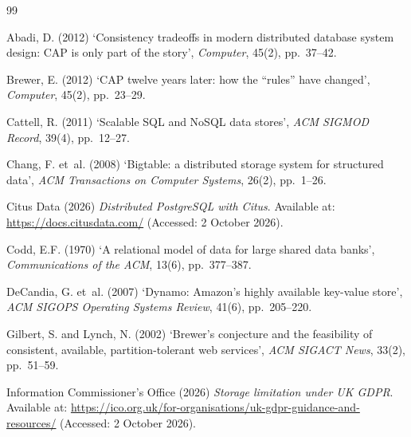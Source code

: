 \documentclass[11pt,a4paper]{article}
\begin{document}
\clearpage
\renewcommand\bibsection{%
  \section*{\refname}%
  \phantomsection
  \addcontentsline{toc}{section}{\refname}%
}
\begin{thebibliography}{99}
\setlength{\itemsep}{0.3em}

 Abadi, D. (2012) `Consistency tradeoffs in modern distributed database system design: CAP is only part of the story', \textit{Computer}, 45(2), pp.~37--42.

 Brewer, E. (2012) `CAP twelve years later: how the ``rules'' have changed', \textit{Computer}, 45(2), pp.~23--29.

 Cattell, R. (2011) `Scalable SQL and NoSQL data stores', \textit{ACM SIGMOD Record}, 39(4), pp.~12--27.

 Chang, F. et~al. (2008) `Bigtable: a distributed storage system for structured data', \textit{ACM Transactions on Computer Systems}, 26(2), pp.~1--26.

 Citus Data (2026) \textit{Distributed PostgreSQL with Citus}. Available at: \url{https://docs.citusdata.com/} (Accessed: 2 October 2026).

 Codd, E.F. (1970) `A relational model of data for large shared data banks', \textit{Communications of the ACM}, 13(6), pp.~377--387.

 DeCandia, G. et~al. (2007) `Dynamo: Amazon's highly available key-value store', \textit{ACM SIGOPS Operating Systems Review}, 41(6), pp.~205--220.

 Gilbert, S. and Lynch, N. (2002) `Brewer's conjecture and the feasibility of consistent, available, partition-tolerant web services', \textit{ACM SIGACT News}, 33(2), pp.~51--59.

 Information Commissioner's Office (2026) \textit{Storage limitation under UK GDPR}. Available at: \url{https://ico.org.uk/for-organisations/uk-gdpr-guidance-and-resources/} (Accessed: 2 October 2026).


\end{thebibliography}
\end{document}
